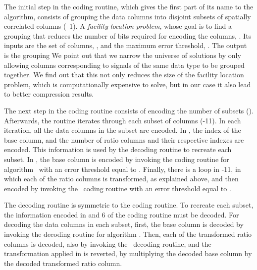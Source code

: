 \vspace{-5pt}



The initial step in the coding routine, which gives the first part of its name to the algorithm, consists of grouping the data columns into disjoint subsets of spatially correlated columns (\Line~1). A \textit{facility location problem}, whose goal is to find a grouping that reduces the number of bits required for encoding the columns, . Its inputs are the set of columns, \columns, and the maximum error threshold, \maxerror. The output is the grouping We point out that we narrow the universe of solutions by only allowing columns corresponding to signals of the same data type to be grouped together. We find out that this not only reduces the size of the facility location problem, which is computationally expensive to solve, but in our case it also lead to better compression results. 


The next step in the coding routine consists of encoding the number of subsets (). Afterwards, the routine iterates through each subset of columns (-11). In each iteration, all the data columns in the subset are encoded. In , the index of the base column, and the number of ratio columns and their respective indexes are encoded. This information is used by the decoding routine to recreate each subset. In , the base column is encoded by invoking the coding routine for algorithm \apcaF\ with an error threshold equal to \epsilonB. Finally, there is a loop in -11, in which each of the ratio columns is transformed, as explained above, and then encoded by invoking the \apcaF\ coding routine with an error threshold equal to \epsilonR. 


The decoding routine is symmetric to the coding routine. To recreate each subset, the information encoded in  and 6 of the coding routine must be decoded. For decoding the data columns in each subset, first, the base column is decoded by invoking the decoding routine for algorithm \apcaF. Then, each of the transformed ratio columns is decoded, also by invoking the \apcaF\ decoding routine, and the transformation applied in  is reverted, by multiplying the decoded base column by the decoded transformed ratio column.


